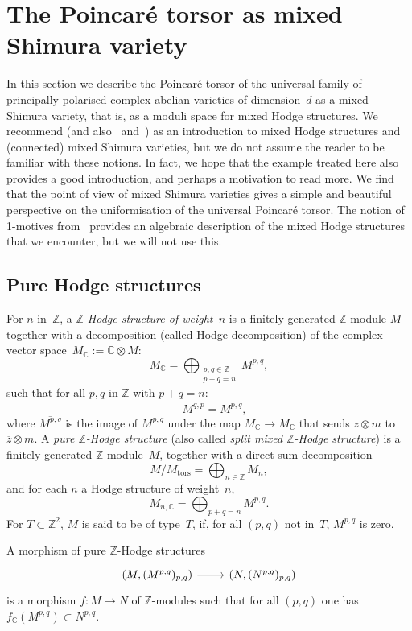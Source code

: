 \documentclass[11pt]{article}
\providecommand{\C}{}
\theoremstyle{plain}
\theoremstyle{definition}
\numberwithin{equation}{subsection}
\let\ol\overline
\renewcommand{\C}{\mathbb C}
\newcommand{\Z}{\mathbb Z}
\newcommand{\tors}{\mathrm{tors}}
\begin{document}
\section{The Poincaré torsor as mixed Shimura variety}\label{sec4}
In this section we describe the Poincaré torsor of the universal
family of principally polarised complex abelian varieties of
dimension~$d$ as a mixed Shimura variety, that is, as a moduli space
for mixed Hodge structures. We recommend \cite[\S 2]{Pink1} (and
also~\cite{Klingler} and~\cite{HodgeII}) as an introduction to mixed
Hodge structures and (connected) mixed Shimura varieties, but we do
not assume the reader to be familiar with these notions. In fact, we
hope that the example treated here also provides a good introduction,
and perhaps a motivation to read more. We find that the point of view
of mixed Shimura varieties gives a simple and beautiful perspective on
the uniformisation of the universal Poincaré torsor. The notion of
1-motives from~\cite{HodgeIII} provides an algebraic description of
the mixed Hodge structures that we encounter, but we will not use this.

\subsection{Pure Hodge structures}
\label{sec:phs}
For $n$ in~$\Z$, a \emph{$\Z$-Hodge structure of weight~$n$} is a
finitely generated $\Z$-module $M$ together with a decomposition
(called Hodge decomposition) of the complex vector
space~$M_\C:=\C\otimes M$:
\[
M_\C = \bigoplus_{\substack{p,q\in\Z\\p+q=n}} M^{p,q},
\]
such that for all $p,q$ in $\Z$ with $p+q=n$:
\[
\quad M^{q,p}=\ol{M^{p,q}},
\]
where $\ol{M^{p,q}}$ is the image of $M^{p,q}$ under the map
$M_\C\to M_\C$ that sends $z\otimes m$ to $\ol{z}\otimes m$. A
\emph{pure $\Z$-Hodge structure} (also called \emph{split mixed
$\Z$-Hodge structure}) is a finitely generated $\Z$-module~$M$,
together with a direct sum decomposition
\[
M/M_\tors=\bigoplus_{n\in\Z}M_n,
\]
and for each $n$ a Hodge structure of weight~$n$,
\[
M_{n,\C}=\bigoplus_{p+q=n}M^{p,q}.
\]
For $T\subset\Z^2$, $M$ is said to be of type~$T$, if, for all $(p,q)$
not in~$T$, $M^{p,q}$ is zero.

A morphism of pure $\Z$-Hodge structures
\[
\begin{tikzcd}
(M,(M^{p,q})_{p,q}) \ar[r] & (N,(N^{p,q})_{p,q})
\end{tikzcd}
\]
is a morphism $f\colon M\!\to\!N$ of $\Z$-modules
such that for all $(p,q)$ one has $f_\C(M^{p,q})\!\subset\!N^{p,q}$.
\end{document}
